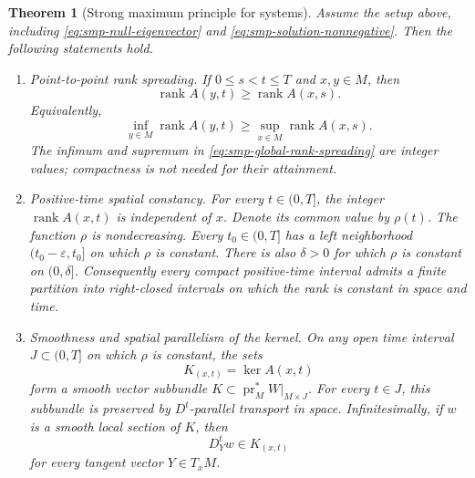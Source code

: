 \documentclass[10pt]{coll-l}
\newtheorem{theorem}{Theorem}[chapter]
\theoremstyle{definition}
\theoremstyle{remark}
\numberwithin{section}{chapter}
\numberwithin{equation}{chapter}
\begin{document}
\begin{theorem}[Strong maximum principle for systems]
\label{thm:smp-systems}
Assume the setup above, including
\eqref{eq:smp-null-eigenvector} and
\eqref{eq:smp-solution-nonnegative}.
Then the following statements hold.

\begin{enumerate}
\item \emph{Point-to-point rank spreading.}
      If $0\leq s<t\leq T$ and $x,y\in M$, then
      \begin{equation}
          \operatorname{rank}A(y,t)
          \geq\operatorname{rank}A(x,s).                 \label{eq:smp-point-rank-spreading}
      \end{equation}
      Equivalently,
      \begin{equation}
       \inf_{y\in M}\operatorname{rank}A(y,t)
       \geq
       \sup_{x\in M}\operatorname{rank}A(x,s).          \label{eq:smp-global-rank-spreading}
      \end{equation}
      The infimum and supremum in
      \eqref{eq:smp-global-rank-spreading} are integer values; compactness
      is not needed for their attainment.

\item \emph{Positive-time spatial constancy.}
      For every $t\in(0,T]$, the integer
      $\operatorname{rank}A(x,t)$ is independent of
      $x$.  Denote its common value by $\rho(t)$.  The function $\rho$ is
      nondecreasing.  Every $t_0\in(0,T]$ has a left neighborhood
      $(t_0-\varepsilon,t_0]$ on which $\rho$ is constant.  There is also
      $\delta>0$ for which $\rho$ is constant on $(0,\delta]$.  Consequently
      every compact positive-time interval admits a finite partition into
      right-closed intervals on which the rank is constant in space and
      time.

\item \emph{Smoothness and spatial parallelism of the kernel.}
      On any open time interval $J\subset(0,T]$ on which $\rho$ is
      constant, the sets
      \[
            K_{(x,t)}=\ker A(x,t)
      \]
      form a smooth vector subbundle
      $K\subset\operatorname{pr}_M^*W|_{M\times J}$.
      For every $t\in J$, this subbundle is preserved by $D^t$-parallel
      transport in space.  Infinitesimally, if $w$ is a smooth local
      section of $K$, then
      \begin{equation}
                  D^t_Yw\in K_{(x,t)}                   \label{eq:smp-kernel-spatial-parallel}
      \end{equation}
      for every tangent vector $Y\in T_xM$.


\end{enumerate}
\end{theorem}
\end{document}
